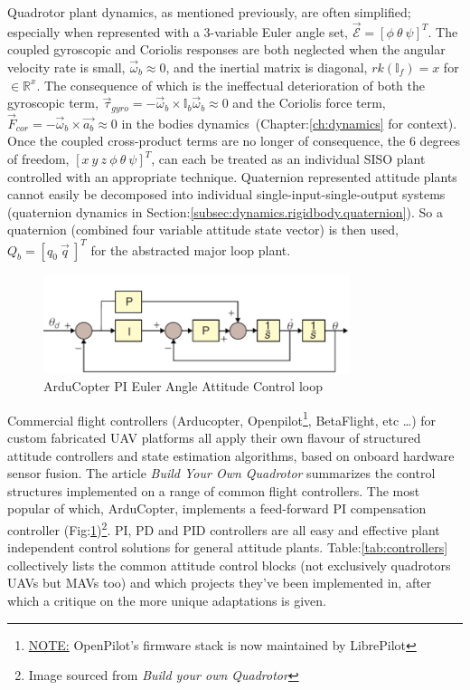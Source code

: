 \par
Quadrotor plant dynamics, as mentioned previously, are often simplified; especially when represented with a 3-variable Euler angle set, $\vec{\mathcal{E}} = [\phi ~\theta ~\psi]^T$. The coupled gyroscopic and Coriolis responses are both neglected when the angular velocity rate is small, $\vec{\omega}_b \approx 0$, and the inertial matrix is diagonal, $rk(\mathbb{I}_f)= x$ for $\in\mathbb{R}^x$. The consequence of which is the ineffectual deterioration of both the gyroscopic term, $\vec{\tau}_{gyro}=-\vec{\omega}_b \times \mathbb{I}_b\vec{\omega}_b \approx 0$ and the  Coriolis force term, $\vec{F}_{cor}=-\vec{\omega}_b \times \vec{a_b} \approx 0$ in the bodies dynamics~(Chapter:\ref{ch:dynamics} for context). Once the coupled cross-product terms are no longer of consequence, the 6 degrees of freedom, $[x ~y ~z ~\phi ~\theta ~\psi]^T$, can each be treated as an individual SISO plant controlled with an appropriate technique. Quaternion represented attitude plants cannot easily be decomposed into individual single-input-single-output systems (quaternion dynamics in Section:\ref{subsec:dynamics.rigidbody.quaternion}). So a quaternion (combined four variable attitude state vector) is then used, $Q_b = [q_0 ~\vec{q}\>]^T$ for the abstracted major loop plant.
\par
\begin{figure}[hbtp]
\centering
\includegraphics[width=0.8\textwidth]{figs/arducopter-pi}
\caption{ArduCopter PI Euler Angle Attitude Control loop}
\label{fig:arducopter-pi}
\end{figure}
Commercial flight controllers (Arducopter\cite{arducoptersite}, Openpilot\cite{openpilotsite}\footnote{\underline{NOTE:} OpenPilot's firmware stack is now maintained by LibrePilot}, BetaFlight\cite{betaflight}, etc \ldots) for custom fabricated UAV platforms all apply their own flavour of structured attitude controllers and state estimation algorithms, based on onboard hardware sensor fusion. The article \emph{Build Your Own Quadrotor}\cite{buildyourownquad} summarizes the control structures implemented on a range of common flight controllers. The most popular of which, ArduCopter, implements a feed-forward PI compensation controller (Fig:\ref{fig:arducopter-pi})\footnote{Image sourced from \emph{Build your own Quadrotor}\cite{buildyourownquad}}.  PI, PD and PID controllers are all easy and effective plant independent control solutions for general attitude plants. Table:\ref{tab:controllers} collectively lists the common attitude control blocks (not exclusively quadrotors UAVs but MAVs too) and which projects they've been implemented in, after which a critique on the more unique adaptations is given.
